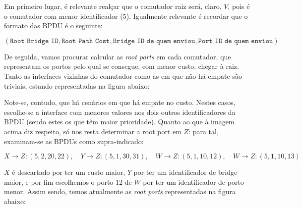 \begin{enumerate}[leftmargin=\labelsep]

        Em primeiro lugar, é relevante realçar que o comutador raiz será, claro,
        $V$, pois é o comutador com menor identificador ($5$). Igualmente
        relevante é recordar que o formato das BPDU é o seguinte:

        $$
          (\texttt{Root Bridge ID}, \texttt{Root Path Cost}, \texttt{Bridge ID de quem enviou}, \texttt{Port ID de quem enviou})
        $$

        De seguida, vamos procurar calcular as \textit{root ports} em cada comutador,
        que representam os portos pelo qual se consegue, com menor custo, chegar
        à raiz. Tanto as interfaces vizinhas do comutador como as em que não há empate são triviais,
        estando representadas na figura abaixo:

        \begin{figure}[H]
          \centering
          
        \end{figure}

        Note-se, contudo, que há cenários em que há empate no custo. Nestes casos,
        escolhe-se a interface com menores valores nos dois outros identificadores
        da BPDU (sendo estes os que têm maior prioridade). Quanto ao que à imagem
        acima diz respeito, só nos resta determinar a root port em $Z$: para tal, examinam-se
        as BPDUs como supra-indicado:

        $$
          X \to Z: (5, 2, 20, 22), \quad
          Y \to Z: (5, 1, 30, 31), \quad
          W \to Z: (5, 1, 10, 12), \quad
          W \to Z: (5, 1, 10, 13)
        $$

        $X$ é descartado por ter um custo maior, $Y$ por ter um identificador de bridge maior,
        e por fim escolhemos o porto $12$ de $W$ por ter um identificador de porto menor.
        Assim sendo, temos atualmente as \textit{root ports} representadas na figura abaixo:

        \begin{figure}[H]
          \centering
          
        \end{figure}


\end{enumerate}
